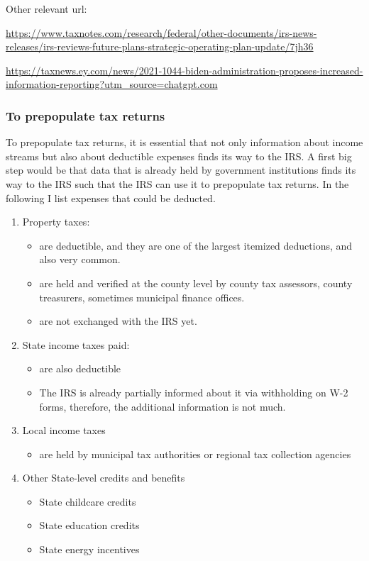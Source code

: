 \documentclass[12pt]{article}
\begin{document}
Other relevant url:

\url{https://www.taxnotes.com/research/federal/other-documents/irs-news-releases/irs-reviews-future-plans-strategic-operating-plan-update/7jh36}

\url{https://taxnews.ey.com/news/2021-1044-biden-administration-proposes-increased-information-reporting?utm_source=chatgpt.com}

\subsubsection{To prepopulate tax returns}
To prepopulate tax returns, it is essential that not only information about income streams but also about deductible expenses finds its way to the IRS. A first big step would be that data that is already held by government institutions finds its way to the IRS such that the IRS can use it to prepopulate tax returns. In the following I list expenses that could be deducted. 
\begin{enumerate}
    \item Property taxes: 
    \begin{itemize}
        \item are deductible, and they are one of the largest itemized deductions, and also very common. 
        \item are held and verified at the county level by county tax assessors, county treasurers, sometimes municipal finance offices.
        \item are not exchanged with the IRS yet. 
    \end{itemize}
    \item State income taxes paid:
    \begin{itemize}
        \item are also deductible
        \item The IRS is already partially informed about it via withholding on W-2 forms, therefore, the additional information is not much. 
    \end{itemize}
    \item Local income taxes 
    \begin{itemize}
        \item are held by municipal tax authorities or regional tax collection agencies
    \end{itemize}
    \item Other State-level credits and benefits
    \begin{itemize}
        \item State childcare credits
        \item State education credits
        \item State energy incentives
    \end{itemize}
\end{enumerate}
\end{document}
